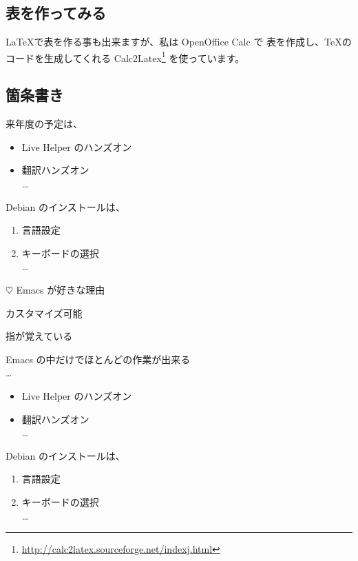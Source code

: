 \documentclass[mingoth,a4paper]{jsarticle}
\begin{document}
\begin{commandline}
\subsection{表を作ってみる}

\LaTeX で表を作る事も出来ますが、私は OpenOffice Calc で
表を作成し、\TeX のコードを生成してくれる
Calc2Latex\footnote{\url{http://calc2latex.sourceforge.net/indexj.html}}
を使っています。

\subsection{箇条書き}

来年度の予定は、
\begin{itemize}
 \item Live Helper のハンズオン
 \item 翻訳ハンズオン\\
\dots{}
\end{itemize}

Debian のインストールは、
\begin{enumerate}
 \item 言語設定
 \item キーボードの選択\\
\dots{}
\end{enumerate}

\begin{list}%
 {$\heartsuit$} %
 {Emacs が好きな理由} %
 \item カスタマイズ可能
 \item 指が覚えている
 \item Emacs の中だけでほとんどの作業が出来る\\
\dots{}
\end{list}

\begin{commandline}
\begin{itemize}
 \item Live Helper のハンズオン
 \item 翻訳ハンズオン\\
\dots{}
\end{itemize}

Debian のインストールは、
\begin{enumerate}
 \item 言語設定
 \item キーボードの選択\\
\dots{}
\end{enumerate}


\end{commandline}
\end{commandline}
\end{document}
